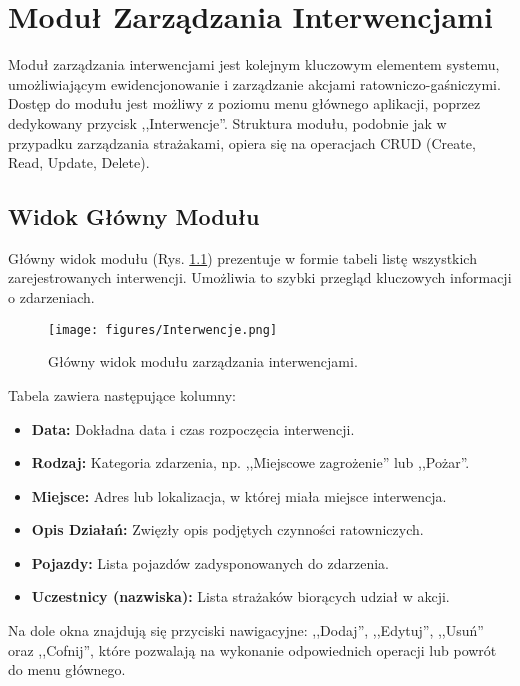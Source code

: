 \chapter{Moduł Zarządzania Interwencjami}
\label{chap:interwencje}

Moduł zarządzania interwencjami jest kolejnym kluczowym elementem systemu, umożliwiającym ewidencjonowanie i zarządzanie akcjami ratowniczo-gaśniczymi. Dostęp do modułu jest możliwy z poziomu menu głównego aplikacji, poprzez dedykowany przycisk ,,Interwencje''. Struktura modułu, podobnie jak w przypadku zarządzania strażakami, opiera się na operacjach CRUD (Create, Read, Update, Delete).

\section{Widok Główny Modułu}
\label{sec:interwencje_widok}

Główny widok modułu (Rys. \ref{fig:interwencje_lista}) prezentuje w formie tabeli listę wszystkich zarejestrowanych interwencji. Umożliwia to szybki przegląd kluczowych informacji o zdarzeniach.

\begin{figure}[H]
	\centering
	\texttt{[image: figures/Interwencje.png]}
	\caption{Główny widok modułu zarządzania interwencjami.}
	\label{fig:interwencje_lista}
\end{figure}

Tabela zawiera następujące kolumny:
\begin{itemize}
    \item \textbf{Data:} Dokładna data i czas rozpoczęcia interwencji.
    \item \textbf{Rodzaj:} Kategoria zdarzenia, np. ,,Miejscowe zagrożenie'' lub ,,Pożar''.
    \item \textbf{Miejsce:} Adres lub lokalizacja, w której miała miejsce interwencja.
    \item \textbf{Opis Działań:} Zwięzły opis podjętych czynności ratowniczych.
    \item \textbf{Pojazdy:} Lista pojazdów zadysponowanych do zdarzenia.
    \item \textbf{Uczestnicy (nazwiska):} Lista strażaków biorących udział w akcji.
\end{itemize}
Na dole okna znajdują się przyciski nawigacyjne: ,,Dodaj'', ,,Edytuj'', ,,Usuń'' oraz ,,Cofnij'', które pozwalają na wykonanie odpowiednich operacji lub powrót do menu głównego.

